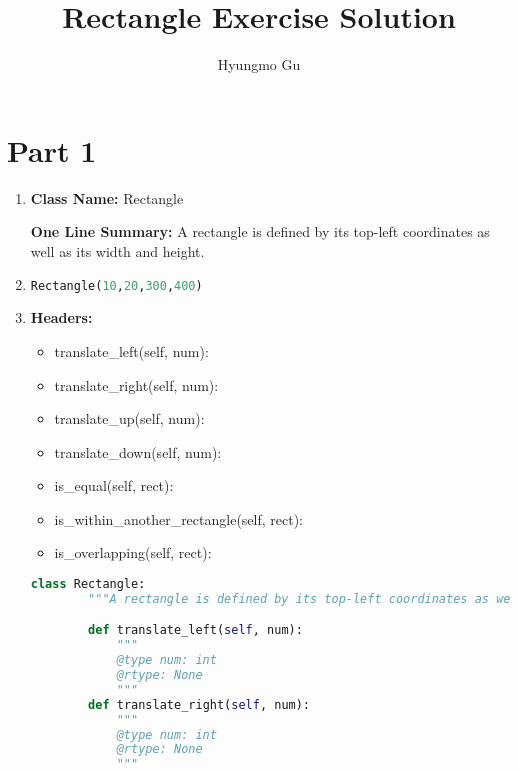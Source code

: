 \documentclass[12pt]{article}
\begin{document}
\title{Rectangle Exercise Solution}
\author{Hyungmo Gu}
\maketitle

\section*{Part 1}
\begin{enumerate}
    \item

    \textbf{Class Name:} Rectangle

    \bigskip

    \textbf{One Line Summary:} A rectangle is defined by its top-left coordinates
    as well as its width and height.

    \item

    \begin{lstlisting}[language=Python]
    Rectangle(10,20,300,400)
    \end{lstlisting}

    \item

    \textbf{Headers:}

    \bigskip

    \begin{itemize}
        \item translate\_left(self, num):
        \item translate\_right(self, num):
        \item translate\_up(self, num):
        \item translate\_down(self, num):
        \item is\_equal(self, rect):
        \item is\_within\_another\_rectangle(self, rect):
        \item is\_overlapping(self, rect):
    \end{itemize}

    \begin{lstlisting}[language=Python]
    class Rectangle:
        """A rectangle is defined by its top-left coordinates as well as its width and height."""

        def translate_left(self, num):
            """
            @type num: int
            @rtype: None
            """
        def translate_right(self, num):
            """
            @type num: int
            @rtype: None
            """


\end{lstlisting}
\end{enumerate}
\end{document}
